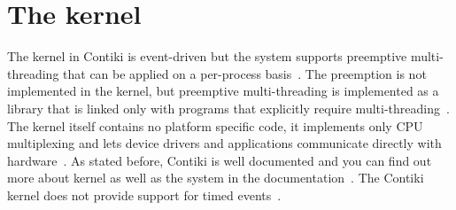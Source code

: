 
\section{The kernel}
The kernel in Contiki is event-driven but the system supports preemptive
multi-threading that can be applied on a per-process basis~\cite{video}.
The preemption is not implemented in the kernel, but
preemptive multi-threading is implemented as a library that is linked only with programs that
explicitly require multi-threading~\cite{paper-contiki}.
The kernel itself contains no platform specific code, it implements only CPU multiplexing and
lets device drivers and applications communicate directly with hardware~\cite{video}.
As stated before, Contiki is well documented and you can find out more about
kernel as well as the system in the documentation~\cite{contiki-docs}.
The Contiki kernel does not provide support for timed events~\cite{contiki-docs}.
